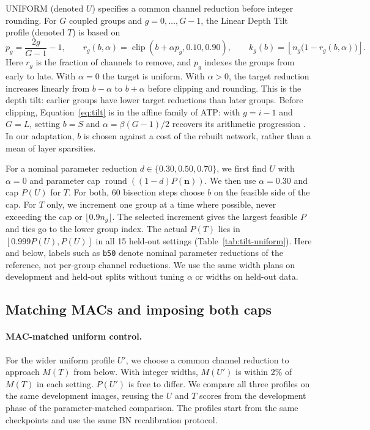 \documentclass[11pt,a4paper]{article}
\newcommand{\Uniform}{UNIFORM}
\newcommand{\TiltName}{Linear Depth Tilt}
\newcommand{\Uprime}{\ensuremath{U'}}
\newcommand{\bfifty}{\texttt{b50}}
\begin{document}
\Uniform{} (denoted $U$) specifies a common channel reduction before
integer rounding. For $G$ coupled groups and $g=0,\ldots,G-1$, the
\TiltName{} profile (denoted $T$) is based on
\begin{equation}
 p_g = \frac{2g}{G-1}-1,\qquad
 r_g(b,\alpha) = \operatorname{clip}(b+\alpha p_g, 0.10, 0.90),\qquad
 k_g(b) = \left\lfloor n_g\bigl(1-r_g(b,\alpha)\bigr)\right\rfloor .
 \label{eq:tilt}
\end{equation}
Here $r_g$ is the fraction of channels to remove, and $p_g$ indexes the
groups from early to late. With $\alpha=0$ the target is uniform. With
$\alpha>0$, the target reduction increases linearly from $b-\alpha$ to
$b+\alpha$ before clipping and rounding. This is the depth tilt: earlier
groups have lower target reductions than later groups. Before clipping,
Equation~\eqref{eq:tilt} is in the affine family of
ATP: with $g=i-1$ and $G=L$, setting $b=S$ and $\alpha=\beta(G-1)/2$
recovers its arithmetic progression \citep[Eq.~10]{huang2025atp}. In our
adaptation, $b$ is chosen against a cost of the rebuilt network, rather
than a mean of layer sparsities.

For a nominal parameter reduction $d\in\{0.30,0.50,0.70\}$, we first
find $U$ with $\alpha=0$ and parameter cap
$\operatorname{round}((1-d)P(\mathbf n))$. We then use $\alpha=0.30$ and
cap $P(U)$ for $T$. For both, 60 bisection steps choose $b$ on the feasible
side of the cap. For $T$ only, we increment one group at a time where
possible, never exceeding the cap or $\lfloor0.9n_g\rfloor$. The selected
increment gives the largest feasible $P$ and ties go to the lower group
index. The actual $P(T)$ lies in $[0.999P(U),P(U)]$ in all 15 held-out
settings (Table~\ref{tab:tilt-uniform}). Here and below, labels such as
\bfifty{} denote nominal parameter reductions of the reference, not
per-group channel reductions. We use the same width plans on development
and held-out splits without tuning $\alpha$ or widths on held-out data.

\subsection{Matching MACs and imposing both caps}
\label{sec:caps}

\paragraph{MAC-matched uniform control.} For the wider uniform profile
\Uprime{}, we choose a common channel reduction to approach $M(T)$ from
below. With integer widths, $M(\Uprime{})$ is within 2\% of $M(T)$ in each
setting. $P(\Uprime{})$ is free to differ. We compare all three profiles on
the same development images, reusing the $U$ and $T$ scores from the
development phase of the parameter-matched comparison. The profiles
start from the same checkpoints and use the same BN recalibration protocol.
\end{document}
